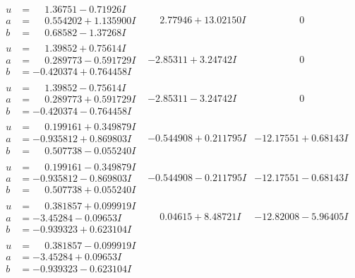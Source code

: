 \documentclass[1p]{elsarticle_modified}
\theoremstyle{definition}
\begin{document}
$$\begin{array}{c|c|c}
\begin{aligned}
u &= \phantom{-}1.36751 - 0.71926 I \\
a &= \phantom{-}0.554202 + 1.135900 I \\
b &= \phantom{-}0.68582 - 1.37268 I\end{aligned}
 & \phantom{-}2.77946 + 13.02150 I & \phantom{-0.000000 } 0 \\ \hline\begin{aligned}
u &= \phantom{-}1.39852 + 0.75614 I \\
a &= \phantom{-}0.289773 - 0.591729 I \\
b &= -0.420374 + 0.764458 I\end{aligned}
 & -2.85311 + 3.24742 I & \phantom{-0.000000 } 0 \\ \hline\begin{aligned}
u &= \phantom{-}1.39852 - 0.75614 I \\
a &= \phantom{-}0.289773 + 0.591729 I \\
b &= -0.420374 - 0.764458 I\end{aligned}
 & -2.85311 - 3.24742 I & \phantom{-0.000000 } 0 \\ \hline\begin{aligned}
u &= \phantom{-}0.199161 + 0.349879 I \\
a &= -0.935812 + 0.869803 I \\
b &= \phantom{-}0.507738 - 0.055240 I\end{aligned}
 & -0.544908 + 0.211795 I & -12.17551 + 0.68143 I \\ \hline\begin{aligned}
u &= \phantom{-}0.199161 - 0.349879 I \\
a &= -0.935812 - 0.869803 I \\
b &= \phantom{-}0.507738 + 0.055240 I\end{aligned}
 & -0.544908 - 0.211795 I & -12.17551 - 0.68143 I \\ \hline\begin{aligned}
u &= \phantom{-}0.381857 + 0.099919 I \\
a &= -3.45284 - 0.09653 I \\
b &= -0.939323 + 0.623104 I\end{aligned}
 & \phantom{-}0.04615 + 8.48721 I & -12.82008 - 5.96405 I \\ \hline\begin{aligned}
u &= \phantom{-}0.381857 - 0.099919 I \\
a &= -3.45284 + 0.09653 I \\
b &= -0.939323 - 0.623104 I\end{aligned}

\end{array}$$
\end{document}
